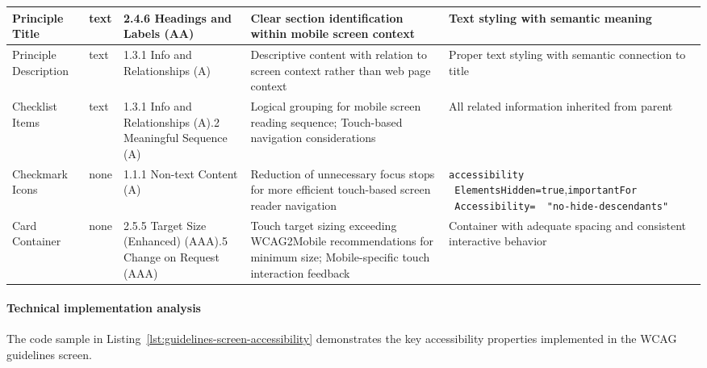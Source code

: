 \begin{longtable}[c]{|C{2.5cm}|C{2cm}|C{2.8cm}|C{3.2cm}|C{4.7cm}|}
\hline
Principle Title & text & 2.4.6 Headings and Labels (AA) & Clear section identification within mobile screen context & Text styling with semantic meaning \\
\hline
Principle Description & text & 1.3.1 Info and Relationships (A) & Descriptive content with relation to screen context rather than web page context & Proper text styling with semantic connection to title \\
\hline
Checklist Items & text & 1.3.1 Info and Relationships (A).2 Meaningful Sequence (A) & Logical grouping for mobile screen reading sequence; Touch-based navigation considerations & All related information inherited from parent \\
\hline
Checkmark Icons & none & 1.1.1 Non-text Content (A) & Reduction of unnecessary focus stops for more efficient touch-based screen reader navigation & \texttt{accessibility \ ElementsHidden=true},\newline \texttt{importantFor \ Accessibility= \ "no-hide-descendants"} \\
\hline
Card Container & none & 2.5.5 Target Size (Enhanced) (AAA).5 Change on Request (AAA) & Touch target sizing exceeding WCAG2Mobile recommendations for minimum size; Mobile-specific touch interaction feedback & Container with adequate spacing and consistent interactive behavior \\
\hline
\end{longtable}

\FloatBarrier

\paragraph{Technical implementation analysis}

The code sample in Listing~\ref{lst:guidelines-screen-accessibility} demonstrates the key accessibility properties implemented in the WCAG guidelines screen.

